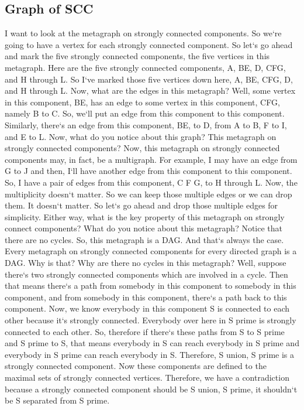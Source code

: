 \subsection{Graph of SCC}
I want to look at the metagraph on strongly connected components.
So we`re going to have a vertex for each strongly connected component.
So let`s go ahead and mark the five strongly connected components, the five vertices in this metagraph.
Here are the five strongly connected components, A, BE, D, CFG, and H through L\@.
So I`ve marked those five vertices down here, A, BE, CFG, D, and H through L\@.
Now, what are the edges in this metagraph? Well, some vertex in this component, BE, has an edge to some vertex in this component, CFG, namely B to C\@.
So, we`ll put an edge from this component to this component.
Similarly, there`s an edge from this component, BE, to D, from A to B, F to I, and E to L\@.
Now, what do you notice about this graph? This metagraph on strongly connected components? Now, this metagraph on strongly connected components may, in fact, be a multigraph.
For example, I may have an edge from G to J and then, I`ll have another edge from this component to this component.
So, I have a pair of edges from this component, C F G, to H through L\@.
Now, the multiplicity doesn`t matter.
So we can keep those multiple edges or we can drop them.
It doesn`t matter.
So let`s go ahead and drop those multiple edges for simplicity.
Either way, what is the key property of this metagraph on strongly connect components? What do you notice about this metagraph? Notice that there are no cycles.
So, this metagraph is a DAG\@.
And that`s always the case.
Every metagraph on strongly connected components for every directed graph is a DAG\@.
Why is that? Why are there no cycles in this metagraph? Well, suppose there`s two strongly connected components which are involved in a cycle.
Then that means there`s a path from somebody in this component to somebody in this component, and from somebody in this component, there`s a path back to this component.
Now, we know everybody in this component S is connected to each other because it`s strongly connected.
Everybody over here in S prime is strongly connected to each other.
So, therefore if there`s these paths from S to S prime and S prime to S, that means everybody in S can reach everybody in S prime and everybody in S prime can reach everybody in S\@.
Therefore, S union, S prime is a strongly connected component.
Now these components are defined to the maximal sets of strongly connected vertices.
Therefore, we have a contradiction because a strongly connected component should be S union, S prime, it shouldn`t be S separated from S prime.
